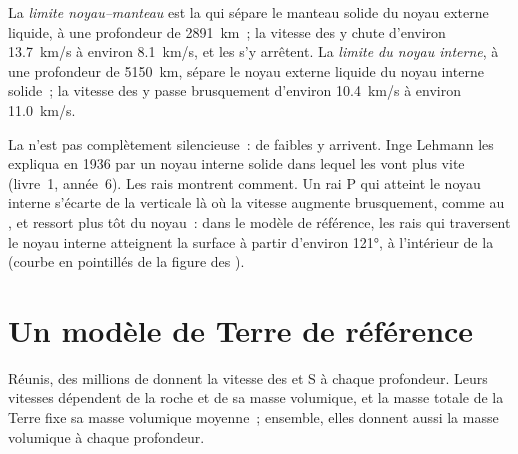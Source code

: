 \begin{definition}\label{def:g11:seismic-structure:core}
La \emph{limite noyau--manteau} est la
 qui sépare le manteau solide du noyau externe
liquide, à une profondeur de \qty{2891}{km}~; la vitesse des  y chute
d'environ \qty{13.7}{km/s} à environ \qty{8.1}{km/s}, et les  s'y
arrêtent. La \emph{limite du noyau interne},
à une profondeur de \qty{5150}{km}, sépare le noyau externe liquide du noyau
interne solide~; la vitesse des  y passe brusquement d'environ
\qty{10.4}{km/s} à environ \qty{11.0}{km/s}.
\end{definition}

La  n'est pas complètement silencieuse~: de faibles  y
arrivent. Inge Lehmann les expliqua en 1936 par un noyau interne solide
dans lequel les  vont plus vite (livre~1, année~6). Les rais
montrent comment. Un rai P qui atteint le noyau interne s'écarte de la
verticale là où la vitesse augmente brusquement, comme au , et ressort
plus tôt du noyau~: dans le modèle de référence, les rais qui traversent le
noyau interne atteignent la surface à partir d'environ \ang{121}, à
l'intérieur de la  (courbe en pointillés de la figure des
).

\section{Un modèle de Terre de référence}\label{sec:g11:seismic-structure:model}

Réunis, des millions de  donnent la vitesse des  et
S à chaque profondeur. Leurs vitesses dépendent de la roche et de sa masse
volumique, et la masse totale de la Terre fixe sa masse volumique
moyenne~; ensemble, elles donnent aussi la masse volumique à chaque
profondeur.

